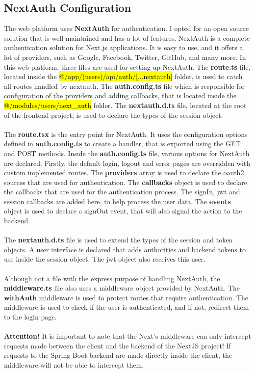 \subsection{NextAuth Configuration}

\noindent The web platform uses \textbf{NextAuth} \cite{nextauth} for authentication. I opted for an open source solution that is well maintained and has a lot of features. NextAuth is a complete authentication solution for Next.js applications. It is easy to use, and it offers a lot of providers, such as Google, Facebook, Twitter, GitHub, and many more.
\newpage
\noindent In this web platform, three files are used for setting up NextAuth. The \textbf{route.ts} file, located inside the \hl{@/app/(users)/api/auth/[...nextauth]} folder, is used to catch all routes handled by nextauth. The \textbf{auth.config.ts} file which is responsible for configuration of the providers and adding callbacks, that is located inside the \hl{@/modules/users/next\_auth} folder. The \textbf{nextauth.d.ts} file, located at the root of the frontend project, is used to declare the types of the session object.
\\\\
\noindent The \textbf{route.tsx} is the entry point for NextAuth. It uses the configuration options defined in \textbf{auth.config.ts} to create a handler, that is exported using the GET and POST methods. Inside the \textbf{auth.config.ts} file, various options for NextAuth are declared. Firstly, the default login, logout and error pages are overridden with custom implemented routes. The \textbf{providers} array is used to declare the oauth2 sources that are used for authentication. The \textbf{callbacks} object is used to declare the callbacks that are used for the authentication process. The signIn, jwt and session callbacks are added here, to help process the user data. The \textbf{events} object is used to declare a signOut event, that will also signal the action to the backend.
\\\\
\noindent The \textbf{nextauth.d.ts} file is used to extend the types of the session and token objects. A user interface is declared that adds authorities and backend tokens to use inside the session object. The jwt object also receives this user.
\\\\
\noindent Although not a file with the express purpose of handling NextAuth, the \textbf{middleware.ts} file also uses a middleware object provided by NextAuth. The \textbf{withAuth} middleware is used to protect routes that require authentication. The middleware is used to check if the user is authenticated, and if not, redirect them to the login page.
\\\\
\noindent \textbf{Attention!} It is important to note that the Next's middleware can only intercept requests made between the client and the backend of the NextJS project! If requests to the Spring Boot backend are made directly inside the client, the middleware will not be able to intercept them.

